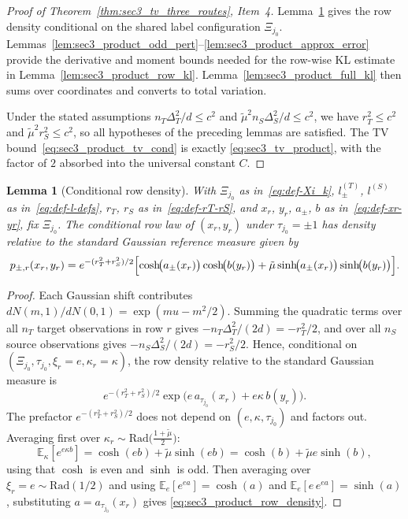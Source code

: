 \documentclass[10pt]{article}
\newtheorem{lemma}{Lemma}
\newcommand{\Ebb}{\mathbb E}
\newcommand{\trg}{T}
\newcommand{\nT}{n_{\trg}}
\newcommand{\DeltaT}{\Delta_{\trg}}
\newcommand{\src}{S}
\newcommand{\nS}{n_{\src}}
\newcommand{\DeltaS}{\Delta_{\src}}
\begin{document}
\begin{proof}[Proof of Theorem~\ref{thm:sec3_tv_three_routes}, Item~4]
	Lemma~\ref{lem:sec3_product_row_density} gives the row density conditional
	on the shared label configuration $\Xi_{j_0}$.
	Lemmas~\ref{lem:sec3_product_odd_pert}--\ref{lem:sec3_product_approx_error}
	provide the derivative and moment bounds needed for the row-wise KL estimate
	in Lemma~\ref{lem:sec3_product_row_kl}.
	Lemma~\ref{lem:sec3_product_full_kl} then sums over coordinates and converts
	to total variation.
	
	Under the stated assumptions $\nT\DeltaT^2/d\le c^2$ and
	$\tilde\mu^2\nS\DeltaS^2/d\le c^2$, we have $r_T^2\le c^2$ and
	$\tilde\mu^2 r_S^2\le c^2$, so all hypotheses of the preceding lemmas are
	satisfied.  The TV bound~\eqref{eq:sec3_product_tv_cond} is exactly
	\eqref{eq:sec3_tv_product}, with the factor of $2$ absorbed into the
	universal constant $C$.
\end{proof}
\begin{lemma}[Conditional row density]
\label{lem:sec3_product_row_density}
With $\Xi_{j_0}$ as in~\eqref{eq:def-Xi_k}, $l^{(\trg)}_\pm$, $l^{(\src)}$ as in~\eqref{eq:def-l-defs}, $r_T$, $r_S$ as in~\eqref{eq:def-rT-rS}, and $x_r$, $y_r$, $a_\pm$, $b$ as in~\eqref{eq:def-xr-yr}, fix $\Xi_{j_0}$.
The conditional row law of $(x_r,y_r)$ under $\tau_{j_0}=\pm1$
has density relative to the standard Gaussian reference measure given by
\begin{equation}
\label{eq:sec3_product_row_density}
    p_{\pm,r}(x_r,y_r)
    =
    e^{-(r_T^2+r_S^2)/2}\Bigl[
        \cosh\!\bigl(a_\pm(x_r)\bigr)\cosh\!\bigl(b(y_r)\bigr)
        + \tilde\mu\sinh\!\bigl(a_\pm(x_r)\bigr)\sinh\!\bigl(b(y_r)\bigr)
    \Bigr].
\end{equation}
\end{lemma}

\begin{proof}
Each Gaussian shift contributes $dN(m,1)/dN(0,1)=\exp(mu-m^2/2)$.
Summing the quadratic terms over all $\nT$ target observations in row $r$
gives $-\nT\DeltaT^2/(2d)=-r_T^2/2$, and over all $\nS$ source observations
gives $-\nS\DeltaS^2/(2d)=-r_S^2/2$.  Hence, conditional on
$(\Xi_{j_0},\tau_{j_0},\xi_r=e,\kappa_r=\kappa)$, the row density relative to the
standard Gaussian measure is
\[
    e^{-(r_T^2+r_S^2)/2}\exp\!\bigl(e\,a_{\tau_{j_0}}(x_r)+e\kappa\,b(y_r)\bigr).
\]
The prefactor $e^{-(r_T^2+r_S^2)/2}$ does not depend on $(e,\kappa,\tau_{j_0})$
and factors out.  Averaging first over
$\kappa_r\sim\mathrm{Rad}\!\bigl(\tfrac{1+\tilde\mu}{2}\bigr)$:
\[
    \Ebb_\kappa[e^{e\kappa b}]
    =
    \cosh(eb)+\tilde\mu\sinh(eb)
    =
    \cosh(b)+\tilde\mu e\sinh(b),
\]
using that $\cosh$ is even and $\sinh$ is odd.  Then averaging over
$\xi_r=e\sim\mathrm{Rad}(1/2)$ and using
$\Ebb_e[e^{ea}]=\cosh(a)$ and $\Ebb_e[e\,e^{ea}]=\sinh(a)$,
substituting $a=a_{\tau_{j_0}}(x_r)$ gives \eqref{eq:sec3_product_row_density}.
\end{proof}
\end{document}
